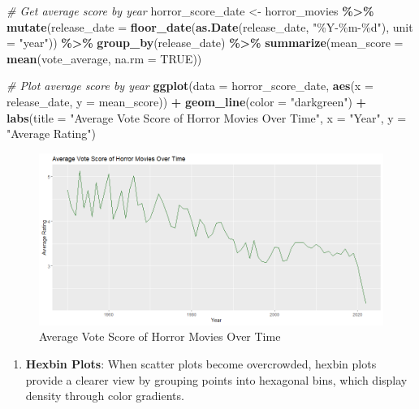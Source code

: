 \documentclass[
]{book}
\newenvironment{Shaded}{\begin{snugshade}}{\end{snugshade}}
\newcommand{\AttributeTok}[1]{\textcolor[rgb]{0.13,0.29,0.53}{#1}}
\newcommand{\CommentTok}[1]{\textcolor[rgb]{0.56,0.35,0.01}{\textit{#1}}}
\newcommand{\ConstantTok}[1]{\textcolor[rgb]{0.56,0.35,0.01}{#1}}
\newcommand{\FunctionTok}[1]{\textcolor[rgb]{0.13,0.29,0.53}{\textbf{#1}}}
\newcommand{\NormalTok}[1]{#1}
\newcommand{\OtherTok}[1]{\textcolor[rgb]{0.56,0.35,0.01}{#1}}
\newcommand{\SpecialCharTok}[1]{\textcolor[rgb]{0.81,0.36,0.00}{\textbf{#1}}}
\newcommand{\StringTok}[1]{\textcolor[rgb]{0.31,0.60,0.02}{#1}}
\providecommand{\tightlist}{%
  \setlength{\itemsep}{0pt}\setlength{\parskip}{0pt}}
\begin{document}
\begin{Shaded}
\begin{Highlighting}[]
\CommentTok{\# Get average score by year}
\NormalTok{horror\_score\_date }\OtherTok{\textless{}{-}}\NormalTok{ horror\_movies }\SpecialCharTok{\%\textgreater{}\%}
  \FunctionTok{mutate}\NormalTok{(}\AttributeTok{release\_date =} \FunctionTok{floor\_date}\NormalTok{(}\FunctionTok{as.Date}\NormalTok{(release\_date, }\StringTok{"\%Y{-}\%m{-}\%d"}\NormalTok{), }\AttributeTok{unit =} \StringTok{"year"}\NormalTok{)) }\SpecialCharTok{\%\textgreater{}\%}
  \FunctionTok{group\_by}\NormalTok{(release\_date) }\SpecialCharTok{\%\textgreater{}\%}
  \FunctionTok{summarize}\NormalTok{(}\AttributeTok{mean\_score =} \FunctionTok{mean}\NormalTok{(vote\_average, }\AttributeTok{na.rm =} \ConstantTok{TRUE}\NormalTok{))}

\CommentTok{\# Plot average score by year}
\FunctionTok{ggplot}\NormalTok{(}\AttributeTok{data =}\NormalTok{ horror\_score\_date, }\FunctionTok{aes}\NormalTok{(}\AttributeTok{x =}\NormalTok{ release\_date, }\AttributeTok{y =}\NormalTok{ mean\_score)) }\SpecialCharTok{+}
  \FunctionTok{geom\_line}\NormalTok{(}\AttributeTok{color =} \StringTok{"darkgreen"}\NormalTok{) }\SpecialCharTok{+}
  \FunctionTok{labs}\NormalTok{(}\AttributeTok{title =} \StringTok{"Average Vote Score of Horror Movies Over Time"}\NormalTok{, }\AttributeTok{x =} \StringTok{"Year"}\NormalTok{, }\AttributeTok{y =} \StringTok{"Average Rating"}\NormalTok{)}
\end{Highlighting}
\end{Shaded}

\begin{figure}
\centering
\includegraphics[width=1\textwidth,height=\textheight]{images/line_plot.png}
\caption{Average Vote Score of Horror Movies Over Time}
\end{figure}

\begin{enumerate}
\def\labelenumi{\arabic{enumi}.}
\setcounter{enumi}{2}
\tightlist
\item
  \textbf{Hexbin Plots}: When scatter plots become overcrowded, hexbin plots provide a clearer view by grouping points into hexagonal bins, which display density through color gradients.
\end{enumerate}
\end{document}
